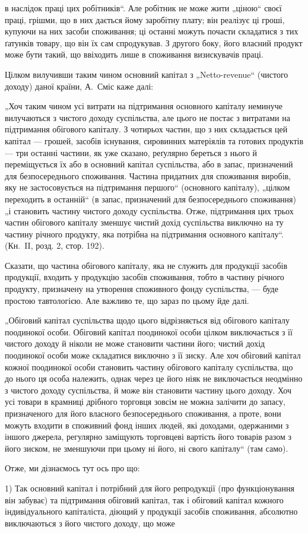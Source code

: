 \parcont{}  %
в наслідок праці цих робітників“. Але робітник не може жити „ціною“
своєї праці, грішми, що в них дається йому заробітну плату; він реалізує
ці гроші, купуючи на них засоби споживання; ці останні можуть
почасти складатися з тих ґатунків товару, що він їх сам спродукував.
З другого боку, його власний продукт може бути такий, що ввіходить
лише в споживання визискувачів праці.

Цілком вилучивши таким чином основний капітал з „Netto-revenue“
(чистого доходу) даної країни, А.~Сміс каже далі:

„Хоч таким чином усі витрати на підтримання основного капіталу
неминуче вилучаються з чистого доходу суспільства, але цього не постає
з витратами на підтримання обігового капіталу. З чотирьох частин, що
з них складається цей капітал — грошей, засобів існування, сировинних
матеріялів та готових продуктів — три останні частини, як уже сказано,
реґулярно береться з нього й переміщується їх або в основний капітал
суспільства, або в запас, призначений для безпосереднього споживання.
Частина придатних для споживання виробів, яку не застосовується на
підтримання першого“ (основного капіталу), „цілком переходить в останній“
(в запас, призначений для безпосереднього споживання) „і становить
частину чистого доходу суспільства. Отже, підтримання цих трьох
частин обігового капіталу зменшує чистий дохід суспільства виключно
на ту частину річного продукту, яка потрібна на підтримання основного
капіталу“. (Кн.~II, розд. 2, стор. 192).

Сказати, що частина обігового капіталу, яка не служить для продукції
засобів продукції, входить у продукцію засобів споживання, тобто в частину
річного продукту, призначену на утворення споживного фонду
суспільства, — буде простою тавтологією. Але важливо те, що зараз по
цьому йде далі.

„Обіговий капітал суспільства щодо цього відрізняється від обігового
капіталу поодинокої особи. Обіговий капітал поодинокої особи цілком
виключається з її чистого доходу й ніколи не може становити частини
його; чистий дохід поодинокої особи може складатися виключно з її
зиску. Але хоч обіговий капітал кожної поодинокої особи становить
частину обігового капіталу суспільства, що до нього ця особа належить,
однак через це його ніяк не виключається неодмінно з чистого доходу
суспільства, й може він становити частину цього доходу. Хоч усі товари
в крамниці дрібного торговця зовсім не можна залічити до запасу, призначеного
для його власного безпосереднього споживання, а проте, вони
можуть входити в споживний фонд інших людей, які доходами, одержаними
з іншого джерела, регулярно заміщують торговцеві вартість його
товарів разом з його зиском, не зменшуючи при цьому ні його, ні свого
капіталу“ (там само).

Отже, ми дізнаємось тут ось про що:

1) Так основний капітал і потрібний для його репродукції (про функціонування
він забуває) та підтримання обіговий капітал, так і обіговий
капітал кожного індивідуального капіталіста, діющий у продукції засобів
споживання, абсолютно виключаються з його чистого доходу, що може
\parbreak{}  %
